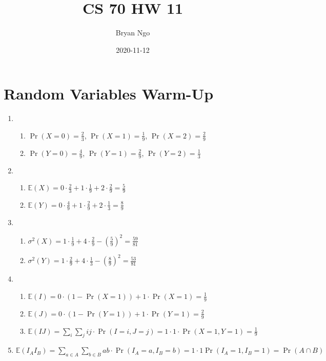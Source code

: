 \documentclass{article}
\title{CS 70 HW 11}
\author{Bryan Ngo}
\date{2020-11-12}
\newcommand{\E}{\mathbb{E}}
\begin{document}
\maketitle

\section{Random Variables Warm-Up}

\begin{enumerate}
    \item
        \begin{enumerate}
            \item \(\Pr(X = 0) = \frac{2}{3}\), \(\Pr(X = 1) = \frac{1}{9}\), \(\Pr(X = 2) = \frac{2}{9}\)
            \item \(\Pr(Y = 0) = \frac{4}{9}\), \(\Pr(Y = 1) = \frac{2}{9}\), \(\Pr(Y = 2) = \frac{1}{3}\)
        \end{enumerate}
    \item
        \begin{enumerate}
            \item \(\E(X) = 0 \cdot \frac{2}{3} + 1 \cdot \frac{1}{9} + 2 \cdot \frac{2}{9} = \frac{5}{9}\)
            \item \(\E(Y) = 0 \cdot \frac{4}{9} + 1 \cdot \frac{2}{9} + 2 \cdot \frac{1}{3} = \frac{8}{9}\)
        \end{enumerate}
    \item
        \begin{enumerate}
            \item \(\sigma^2(X) = 1 \cdot \frac{1}{9} + 4 \cdot \frac{2}{9} - \left(\frac{5}{9}\right)^2 = \frac{59}{81}\)
            \item \(\sigma^2(Y) = 1 \cdot \frac{2}{9} + 4 \cdot \frac{1}{3} - \left(\frac{8}{9}\right)^2 = \frac{53}{81}\)
        \end{enumerate}
    \item
        \begin{enumerate}
            \item \(\E(I) = 0 \cdot (1 - \Pr(X = 1)) + 1 \cdot \Pr(X = 1) = \frac{1}{9}\)
            \item \(\E(J) = 0 \cdot (1 - \Pr(Y = 1)) + 1 \cdot \Pr(Y = 1) = \frac{2}{9}\)
            \item \(\E(IJ) = \sum_i \sum_j ij \cdot \Pr(I = i, J = j) = 1 \cdot 1 \cdot \Pr(X = 1, Y = 1) = \frac{1}{9}\)
        \end{enumerate}
    \item \(\E(I_A I_B) = \sum_{a \in A} \sum_{b \in B} ab \cdot \Pr(I_A = a, I_B = b) = 1 \cdot 1 \Pr(I_A = 1, I_B = 1) = \Pr(A \cap B)\)
\end{enumerate}
\end{document}
